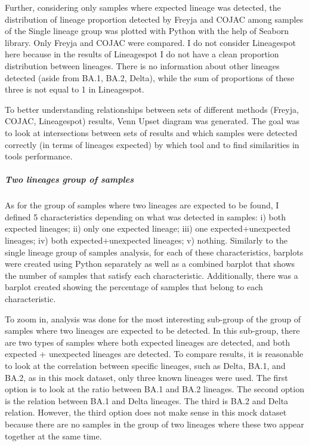                 Further, considering only samples where expected lineage was detected, the distribution of lineage proportion detected by Freyja and COJAC among samples of the Single lineage group was plotted with Python with the help of Seaborn library. Only Freyja and COJAC were compared. I do not consider Lineagespot here because in the results of Lineagespot I do not have a clean proportion distribution between lineages. There is no information about other lineages detected (aside from BA.1, BA.2, Delta), while the sum of proportions of these three is not equal to 1 in Lineagespot.
                
                To better understanding relationships between sets of different methods (Freyja, COJAC, Lineagespot) results, Venn Upset diagram was generated. The goal was to look at intersections between sets of results and which samples were detected correctly (in terms of lineages expected) by which tool and to find similarities in tools performance.

            
                \subparagraph{Two lineages group of samples}
                As for the group of samples where two lineages are expected to be found, I defined 5 characteristics depending on what was detected in samples: i) both expected lineages; ii) only one expected lineage; iii) one expected+unexpected lineages; iv) both expected+unexpected lineages; v) nothing. Similarly to the single lineage group of samples analysis, for each of these characteristics, barplots were created using Python separately as well as a combined barplot that shows the number of samples that satisfy each characteristic. Additionally, there was a barplot created showing the percentage of samples that belong to each characteristic.

                To zoom in, analysis was done for the most interesting sub-group of the group of samples where two lineages are expected to be detected. In this sub-group, there are two types of samples where both expected lineages are detected, and both expected + unexpected lineages are detected. To compare results, it is reasonable to look at the correlation between specific lineages, such as Delta, BA.1, and BA.2, as in this mock dataset, only three known lineages were used. The first option is to look at the ratio between BA.1 and BA.2 lineages. The second option is the relation between BA.1 and Delta lineages. The third is BA.2 and Delta relation. However, the third option does not make sense in this mock dataset because there are no samples in the group of two lineages where these two appear together at the same time.
                
